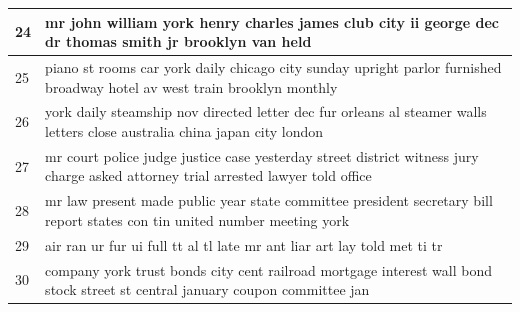 \documentclass[10pt,journal,compsoc]{IEEEtran}
\begin{document}
\begin{table}
{\begin{tabular}{|p{1cm}|p{16cm}|}
    24       & mr john william york henry charles james club city ii george dec dr thomas smith jr brooklyn van held                                                 \\ \hline
    25       & piano st rooms car york daily chicago city sunday upright parlor furnished broadway hotel av west train brooklyn monthly                              \\ \hline
    26       & york daily steamship nov directed letter dec fur orleans al steamer walls letters close australia china japan city london                             \\ \hline
    27       & mr court police judge justice case yesterday street district witness jury charge asked attorney trial arrested lawyer told office                     \\ \hline
    28       & mr law present made public year state committee president secretary bill report states con tin united number meeting york                             \\ \hline
    29       & air ran ur fur ui full tt al tl late mr ant liar art lay told met ti tr                                                                               \\ \hline
    30       & company york trust bonds city cent railroad mortgage interest wall bond stock street st central january coupon committee jan                          \\ \hline
    \end{tabular}}

\end{table}
\end{document}
